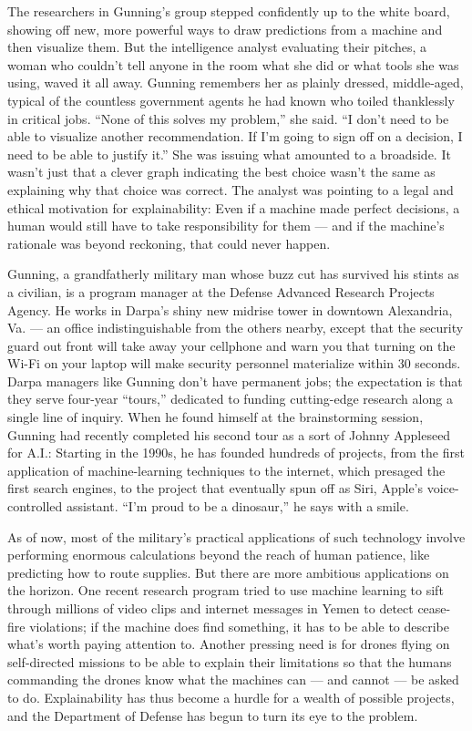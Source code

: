 The researchers in Gunning's group stepped confidently up to the white
board, showing off new, more powerful ways to draw predictions from a
machine and then visualize them. But the intelligence analyst evaluating
their pitches, a woman who couldn't tell anyone in the room what she did
or what tools she was using, waved it all away. Gunning remembers her as
plainly dressed, middle-aged, typical of the countless government agents
he had known who toiled thanklessly in critical jobs. ``None of this
solves my problem,'' she said. ``I don't need to be able to visualize
another recommendation. If I'm going to sign off on a decision, I need
to be able to justify it.'' She was issuing what amounted to a
broadside. It wasn't just that a clever graph indicating the best choice
wasn't the same as explaining why that choice was correct. The analyst
was pointing to a legal and ethical motivation for explainability: Even
if a machine made perfect decisions, a human would still have to take
responsibility for them --- and if the machine's rationale was beyond
reckoning, that could never happen.

Gunning, a grandfatherly military man whose buzz cut has survived his
stints as a civilian, is a program manager at the Defense Advanced
Research Projects Agency. He works in Darpa's shiny new midrise tower in
downtown Alexandria, Va. --- an office indistinguishable from the others
nearby, except that the security guard out front will take away your
cellphone and warn you that turning on the Wi-Fi on your laptop will
make security personnel materialize within 30 seconds. Darpa managers
like Gunning don't have permanent jobs; the expectation is that they
serve four-year ``tours,'' dedicated to funding cutting-edge research
along a single line of inquiry. When he found himself at the
brainstorming session, Gunning had recently completed his second tour as
a sort of Johnny Appleseed for A.I.: Starting in the 1990s, he has
founded hundreds of projects, from the first application of
machine-learning techniques to the internet, which presaged the first
search engines, to the project that eventually spun off as Siri, Apple's
voice-controlled assistant. ``I'm proud to be a dinosaur,'' he says with
a smile.

As of now, most of the military's practical applications of such
technology involve performing enormous calculations beyond the reach of
human patience, like predicting how to route supplies. But there are
more ambitious applications on the horizon. One recent research program
tried to use machine learning to sift through millions of video clips
and internet messages in Yemen to detect cease-fire violations; if the
machine does find something, it has to be able to describe what's worth
paying attention to. Another pressing need is for drones flying on
self-directed missions to be able to explain their limitations so that
the humans commanding the drones know what the machines can --- and
cannot --- be asked to do. Explainability has thus become a hurdle for a
wealth of possible projects, and the Department of Defense has begun to
turn its eye to the problem.

